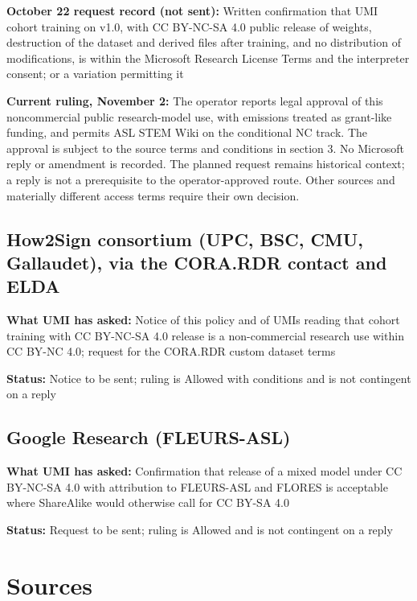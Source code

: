 \documentclass[10pt,a4paper]{article}
\begin{document}
\textbf{October 22 request record (not sent):} Written confirmation that UMI cohort
training on v1.0, with CC BY-NC-SA 4.0 public release of weights,
destruction of the dataset and derived files after training, and no
distribution of modifications, is within the Microsoft Research License
Terms and the interpreter consent; or a variation permitting it

\textbf{Current ruling, November 2:} The operator reports legal approval
of this noncommercial public research-model use, with emissions treated
as grant-like funding, and permits ASL STEM Wiki on the conditional NC
track. The approval is subject to the source terms and conditions in
section 3. No Microsoft reply or amendment is recorded. The planned
request remains historical context; a reply is not a prerequisite to
the operator-approved route. Other sources and materially different
access terms require their own decision.

\subsection{How2Sign consortium (UPC, BSC, CMU, Gallaudet), via the
CORA.RDR contact and
ELDA}\label{how2sign-consortium-upc-bsc-cmu-gallaudet-via-the-corardr-contact-and-elda}

\textbf{What UMI has asked:} Notice of this policy and of
UMI\textquotesingle s reading that cohort training with CC BY-NC-SA 4.0
release is a non-commercial research use within CC BY-NC 4.0; request
for the CORA.RDR custom dataset terms

\textbf{Status:} Notice to be sent; ruling is Allowed with conditions
and is not contingent on a reply

\subsection{Google Research
(FLEURS-ASL)}\label{google-research-fleurs-asl}

\textbf{What UMI has asked:} Confirmation that release of a mixed model
under CC BY-NC-SA 4.0 with attribution to FLEURS-ASL and FLORES is
acceptable where ShareAlike would otherwise call for CC BY-SA 4.0

\textbf{Status:} Request to be sent; ruling is Allowed and is not
contingent on a reply

\section{Sources}\label{sources}
\end{document}
